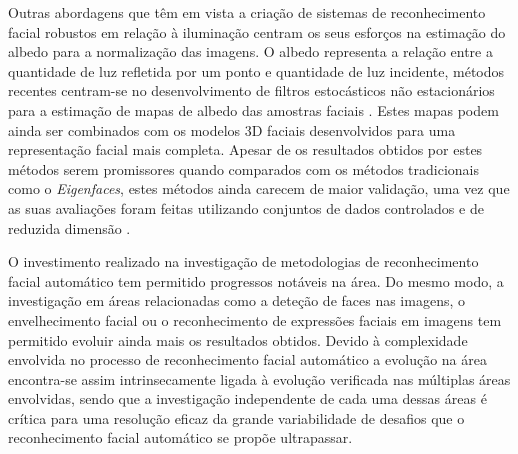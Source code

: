  Outras abordagens que têm em vista a criação de sistemas de reconhecimento facial robustos em relação à iluminação centram os seus esforços na estimação do albedo para a normalização das imagens. O albedo representa a relação entre a quantidade de luz refletida por um ponto e quantidade de luz incidente, métodos recentes centram-se no desenvolvimento de filtros estocásticos não estacionários para a estimação de mapas de albedo das amostras faciais \cite{Biswas2009}. Estes mapas podem ainda ser combinados com os modelos 3D faciais desenvolvidos para uma representação facial mais completa. Apesar de os resultados obtidos por estes métodos serem promissores quando comparados com os métodos tradicionais como o \textit{Eigenfaces}, estes métodos ainda carecem de maior validação, uma vez que as suas avaliações foram feitas utilizando conjuntos de dados controlados e de reduzida dimensão \citep{Chellappa2010}.
 
O investimento realizado na investigação de metodologias de reconhecimento facial automático tem permitido progressos notáveis na área. Do mesmo modo, a investigação em áreas relacionadas como a deteção de faces nas imagens, o envelhecimento facial ou o reconhecimento de expressões faciais em imagens tem permitido evoluir ainda mais os resultados obtidos. Devido à complexidade envolvida no processo de reconhecimento facial automático a evolução na área encontra-se assim intrinsecamente ligada à evolução verificada nas múltiplas áreas envolvidas, sendo que a investigação independente de cada uma dessas áreas é crítica para uma resolução eficaz da grande variabilidade de desafios que o reconhecimento facial automático se propõe ultrapassar.

